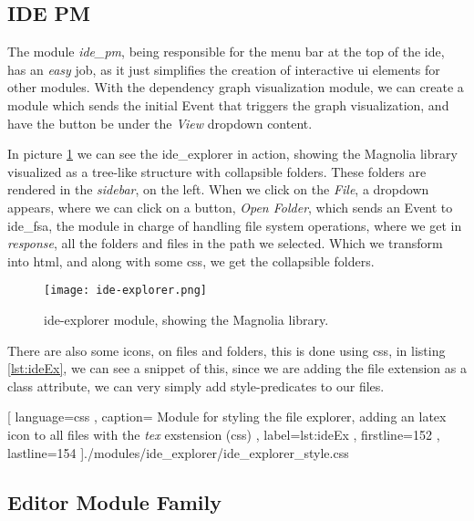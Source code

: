 \subsection{IDE PM}

The module \textit{ide\_pm}, being responsible for the menu bar at the top of
the \gls{ide}, has an \textit{easy} job, as it just simplifies the creation of
interactive \gls{ui} elements for other modules. With the dependency graph
visualization module, we can create a module which sends the initial Event that
triggers the graph visualization, and have the button be under the \textit{View}
dropdown content.

In picture \ref{pic:ideEx} we can see the ide\_explorer in action, showing the
Magnolia library visualized as a tree-like structure with collapsible folders.
These folders are rendered in the \textit{sidebar}, on the left. When we click
on the \textit{File}, a dropdown appears, where we can click on a button,
\textit{Open Folder}, which sends an Event to \gls{ide}\_fsa, the module in
charge of handling file system operations, where we get in \textit{response},
all the folders and files in the path we selected. Which we transform into
\gls{html}, and along with some \gls{css}, we get the collapsible folders.

\begin{figure}
  \centering
  \texttt{[image: ide-explorer.png]}
  \caption{
    \gls{ide}-explorer module, showing the Magnolia library.
  }
  \label{pic:ideEx}
\end{figure}

There are also some icons, on files and folders, this is done using \gls{css},
in listing \ref{lst:ideEx}, we can see a snippet of this, since we are adding
the file extension as a class attribute, we can very simply add
style-predicates to our files.

\begin{center}
  
    [ language=css
    , caption={
      Module for styling the file explorer, adding an latex icon to all files
      with the \textit{tex} exstension (\gls{css})
    }
    , label=lst:ideEx
    , firstline=152
    , lastline=154
    ]{./modules/ide\_explorer/ide\_explorer\_style.css}
\end{center}

\subsection{Editor Module Family}

